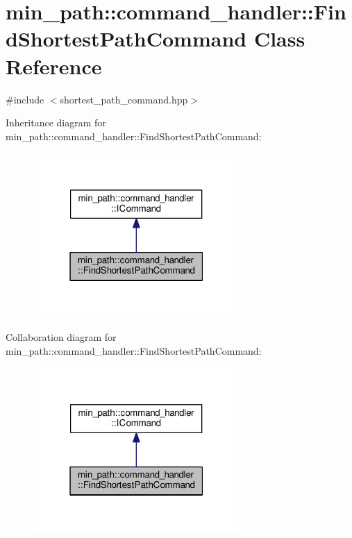 \hypertarget{classmin__path_1_1command__handler_1_1_find_shortest_path_command}{}\section{min\+\_\+path\+:\+:command\+\_\+handler\+:\+:Find\+Shortest\+Path\+Command Class Reference}
\label{classmin__path_1_1command__handler_1_1_find_shortest_path_command}


{\ttfamily \#include $<$shortest\+\_\+path\+\_\+command.\+hpp$>$}



Inheritance diagram for min\+\_\+path\+:\+:command\+\_\+handler\+:\+:Find\+Shortest\+Path\+Command\+:
\nopagebreak
\begin{figure}[H]
\begin{center}
\leavevmode
\includegraphics[width=223pt]{classmin__path_1_1command__handler_1_1_find_shortest_path_command__inherit__graph}
\end{center}
\end{figure}


Collaboration diagram for min\+\_\+path\+:\+:command\+\_\+handler\+:\+:Find\+Shortest\+Path\+Command\+:
\nopagebreak
\begin{figure}[H]
\begin{center}
\leavevmode
\includegraphics[width=223pt]{classmin__path_1_1command__handler_1_1_find_shortest_path_command__coll__graph}
\end{center}
\end{figure}
